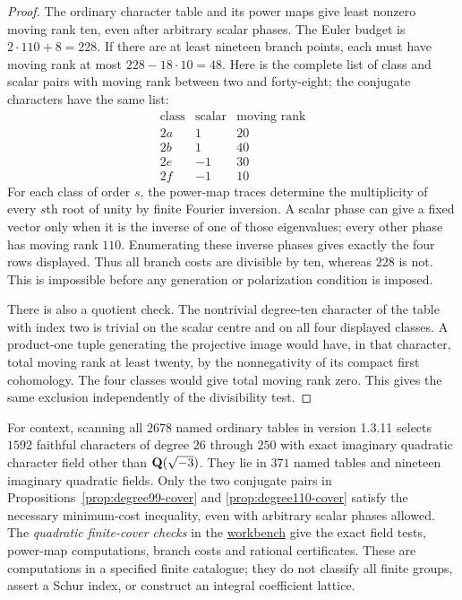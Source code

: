 \begin{proof}
The ordinary character table and its power maps give least nonzero
moving rank ten, even after arbitrary scalar phases.  The Euler
budget is $2\cdot110+8=228$.  If there are at least nineteen branch
points, each must have moving rank at most $228-18\cdot10=48$.
Here is the complete list of class and scalar pairs with moving
rank between two and forty-eight; the conjugate characters have the
same list:
\[
\begin{array}{c|r|r}
 \text{class}&\text{scalar}&\text{moving rank}\\\hline
 2a&1&20\\
 2b&1&40\\
 2e&-1&30\\
 2f&-1&10
\end{array}
\]
For each class of order $s$, the power-map traces determine the
multiplicity of every $s$th root of unity by finite Fourier inversion.
A scalar phase can give a fixed vector only when it is the inverse
of one of those eigenvalues; every other phase has moving rank
$110$.  Enumerating these inverse phases gives exactly the four
rows displayed.  Thus all branch costs are divisible by ten, whereas
$228$ is not.  This is impossible before any generation or
polarization condition is imposed.

There is also a quotient check.  The nontrivial degree-ten character
of the table with index two is trivial on the scalar centre and on
all four displayed classes.  A product-one tuple generating the
projective image would have, in that character, total moving rank
at least twenty, by the nonnegativity of its compact first cohomology.
The four classes would give total moving rank zero.  This gives
the same exclusion independently of the divisibility test.
\end{proof}

For context, scanning all $2678$ named ordinary tables in version
1.3.11 selects $1592$ faithful characters of degree $26$ through
$250$ with exact imaginary quadratic character field other than
$\mathbf Q(\sqrt{-3})$.  They lie in $371$ named tables and nineteen
imaginary quadratic fields.  Only the two conjugate pairs in
Propositions~\ref{prop:degree99-cover} and
\ref{prop:degree110-cover} satisfy the necessary minimum-cost
inequality, even with arbitrary scalar phases allowed.
The \emph{quadratic finite-cover checks} in the
\href{\workbenchurl}{workbench} give the exact field tests,
power-map computations, branch costs and rational certificates.
These are computations in a specified finite catalogue; they do
not classify all finite groups, assert a Schur index, or construct
an integral coefficient lattice.

